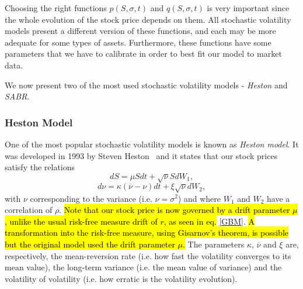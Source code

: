 Choosing the right functions $p(S,\sigma,t)$ and $q(S,\sigma,t)$ is very important since the whole evolution of the stock price depends on them. All stochastic volatility models present a different version of these functions, and each may be more adequate for some types of assets. Furthermore, these functions have some parameters that we have to calibrate in order to best fit our model to market data.

We now present two of the most used stochastic volatility models - \emph{Heston} and \emph{SABR}.



\subsubsection{Heston Model}
One of the most popular stochastic volatility models is known as \emph{Heston model}. It was developed in 1993 by Steven Heston~\cite{Heston} and it states that our stock prices satisfy the relations
\begin{equation}
dS=\mu Sdt+\sqrt{\nu}SdW_1,
\end{equation}
\begin{equation}
d\nu=\kappa(\overline{\nu}-\nu)dt+\xi\sqrt{\nu}dW_2,
\end{equation}
\noindent with $\nu$ corresponding to the variance (i.e. $\nu=\sigma^2$) and where $W_1$ and $W_2$ have a correlation of $\rho$. \hl{Note that our stock price is now governed by a drift parameter $\mu$, unlike the usual risk-free measure drift of $r$, as seen in eq.} \eqref{GBM}. \hl{A transformation into the risk-free measure, using Gisarnov's theorem, is possible but the original model used the drift parameter $\mu$.}
The parameters $\kappa$, $\overline{\nu}$ and $\xi$ are, respectively, the mean-reversion rate (i.e. how fast the volatility converges to its mean value), the long-term variance (i.e. the mean value of variance) and the volatility of volatility (i.e. how erratic is the volatility evolution).

